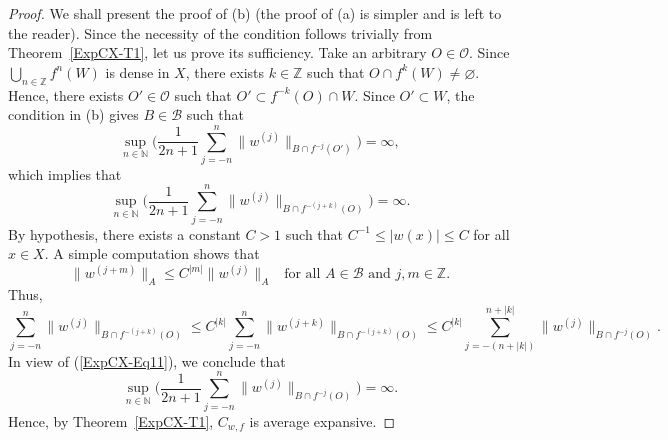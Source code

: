 \documentclass[12pt]{article}
\theoremstyle{plain}
\theoremstyle{definition}
\newcommand{\N}{\mathbb{N}} %
\newcommand{\Z}{\mathbb{Z}} %
\newcommand{\cB}{\mathcal{B}}
\newcommand{\cO}{\mathcal{O}}
\begin{document}
\begin{proof}
We shall present the proof of (b) (the proof of (a) is simpler and is left to the reader).
Since the necessity of the condition follows trivially from Theorem~\ref{ExpCX-T1}, let us prove its sufficiency.
Take an arbitrary $O \in \cO$. Since $\bigcup_{n \in \Z} f^n(W)$ is dense in $X$, there exists $k \in \Z$ such that
$O \cap f^k(W) \neq \varnothing$.
Hence, there exists $O' \in \cO$ such that $O' \subset f^{-k}(O) \cap W$.
Since $O' \subset W$, the condition in (b) gives $B \in \cB$ such that
\[
\sup_{n \in \N} \Big(\frac{1}{2n+1} \sum_{j=-n}^n \|w^{(j)}\|_{B \cap f^{-j}(O')}\Big) = \infty,
\]
which implies that
\begin{equation}\label{ExpCX-Eq11}
\sup_{n \in \N} \Big(\frac{1}{2n+1} \sum_{j=-n}^n \|w^{(j)}\|_{B \cap f^{-(j+k)}(O)}\Big) = \infty.
\end{equation}
By hypothesis, there exists a constant $C > 1$ such that $C^{-1} \leq |w(x)| \leq C$ for all $x \in X$.
A simple computation shows that
\[
\|w^{(j+m)}\|_A \leq C^{|m|} \|w^{(j)}\|_A \ \ \text{ for all } A \in \cB \text{ and } j,m \in \Z.
\]
Thus,
\[
\sum_{j=-n}^n \|w^{(j)}\|_{B \cap f^{-(j+k)}(O)} \leq C^{|k|} \sum_{j=-n}^{n} \|w^{(j+k)}\|_{B \cap f^{-(j+k)}(O)}
\leq C^{|k|} \sum_{j=-(n+|k|)}^{n+|k|} \|w^{(j)}\|_{B \cap f^{-j}(O)}.
\]
In view of (\ref{ExpCX-Eq11}), we conclude that 
\[
\sup_{n \in \N} \Big(\frac{1}{2n+1} \sum_{j=-n}^n \|w^{(j)}\|_{B \cap f^{-j}(O)}\Big) = \infty.
\]
Hence, by Theorem~\ref{ExpCX-T1}, $C_{w,f}$ is average expansive.
\end{proof}
\end{document}
